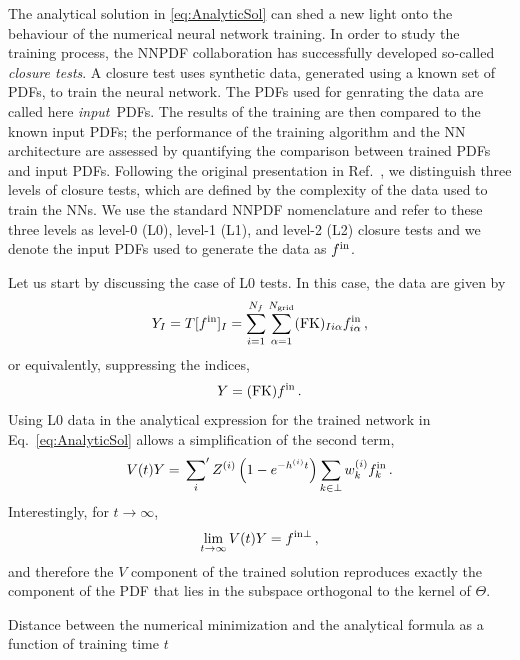 The analytical solution in \eqref{eq:AnalyticSol} can shed a new light onto the
behaviour of the numerical neural network training. In order to study the
training process, the NNPDF collaboration has successfully developed so-called
{\em closure tests}. A closure test uses synthetic data, generated using a known
set of PDFs, to train the neural network. The PDFs used for genrating the data
are called here {\em input}\ PDFs. The results of the training are then compared
to the known input PDFs; the performance of the training algorithm and the NN
architecture are assessed by quantifying the comparison between trained PDFs and
input PDFs. Following the original presentation in Ref.~\cite{NNPDF:2014otw}, we
distinguish three levels of closure tests, which are defined by the complexity
of the data used to train the NNs. We use the standard NNPDF nomenclature and
refer to these three levels as level-0 (L0), level-1 (L1), and level-2 (L2)
closure tests and we denote the input PDFs used to generate the data as $f^{\rm in}$.

Let us start by discussing the case of L0 tests. In this case, the data are
given by
\begin{equation}
    \label{eq:DataL0}
    Y_I = T[f^{\rm in}]_I
        = \sum_{i=1}^{N_{f}} \sum_{\alpha=1}^{N_{\mathrm{grid}}} (\mathrm{FK})_{Ii\alpha} f^{\rm in}_{i\alpha}\, ,
\end{equation}
or equivalently, suppressing the indices,
\begin{equation}
    \label{eq:DataL0NoIndices}
    Y = (\mathrm{FK}) f^{\rm in}\, .
\end{equation}
Using L0 data in the analytical expression for the trained network in
Eq.~\eqref{eq:AnalyticSol} allows a simplification of the second term,
\begin{align}
    \label{eq:L0ClosureTrained}
    V(t) Y = \sideset{}{'}\sum_{i} Z^{(i)} \left(1 - e^{-h^{(i)}t}\right)
        \sum_{k\in\perp} w^{(i)}_k f^{\rm in}_k\, .
\end{align}
Interestingly, for $t\to\infty$,
\begin{align}
    \label{eq:L0ClosureInfiniteTraining}
    \lim_{t\to\infty} V(t) Y = f^{\rm in \perp}\, ,
\end{align}
and therefore the $V$ component of the trained solution reproduces exactly the
component of the PDF that lies in  the subspace orthogonal to the kernel of
$\Theta$.


Distance between the numerical minimization and the analytical formula as a
function of training time $t$



